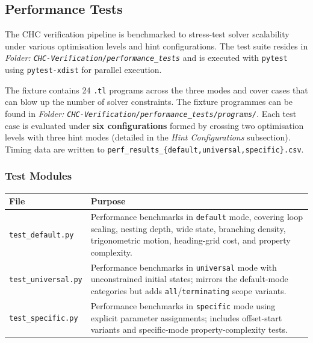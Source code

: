 \subsection*{Performance Tests}
\label{sec:performance_tests}

The CHC verification pipeline is benchmarked to stress-test solver scalability under
various optimisation levels and hint configurations.  The test suite resides in
\noindent\textit{\small Folder: \texttt{CHC-Verification/performance\_tests}} and is executed with
\texttt{pytest} using \texttt{pytest-xdist} for parallel execution.

The fixture contains 24 \texttt{.tl} programs across the three modes and cover cases that can blow up the number of solver constraints. 
The fixture programmes can be found in \noindent\textit{\small Folder: \texttt{CHC-Verification/performance\_tests/programs/}}. 
Each test case is evaluated under \textbf{six configurations} formed by crossing two
optimisation levels with three hint modes (detailed in the \emph{Hint Configurations} subsection).
Timing data are written to \texttt{perf\_results\_\{default,universal,specific\}.csv}.

\subsubsection*{Test Modules}

\begin{longtable}{p{} p{}}
\toprule
\textbf{File} & \textbf{Purpose} \\
\midrule
\endhead
\bottomrule
\endlastfoot
\texttt{test\_default.py}   & Performance benchmarks in \texttt{default} mode, covering loop
  scaling, nesting depth, wide state, branching density, trigonometric motion, heading-grid
  cost, and property complexity. \\[4pt]
\texttt{test\_universal.py} & Performance benchmarks in \texttt{universal} mode with
  unconstrained initial states; mirrors the default-mode categories but adds
  \texttt{all}/\texttt{terminating} scope variants. \\[4pt]
\texttt{test\_specific.py}  & Performance benchmarks in \texttt{specific} mode using
  explicit parameter assignments; includes offset-start variants and specific-mode
  property-complexity tests. \\[4pt]
\end{longtable}

